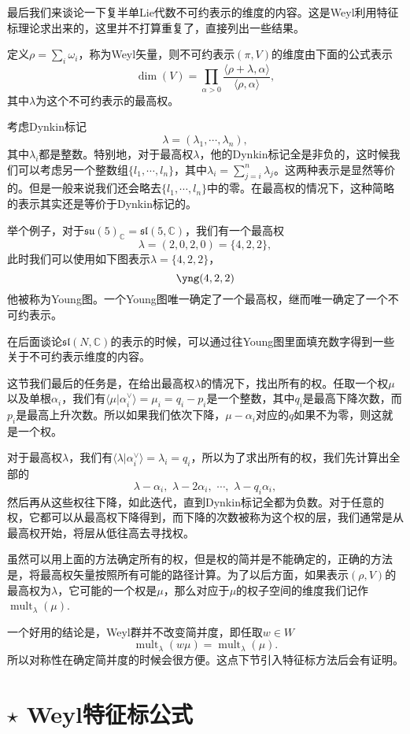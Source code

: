 \documentclass[11pt]{article}
\theoremstyle{definition}
\theoremstyle{plain}
\newcommand{\cc}{\mathbb{C}}
\DeclareMathOperator{\mult}{mult}
\begin{document}
\para 最后我们来谈论一下复半单Lie代数不可约表示的维度的内容。这是Weyl利用特征标理论求出来的，这里并不打算重复了，直接列出一些结果。

定义$\rho=\sum_i \omega_i$，称为Weyl矢量，则不可约表示$(\pi,V)$的维度由下面的公式表示
\[
	\dim(V)=\prod_{\alpha>0}\frac{\langle \rho+\lambda,\alpha\rangle}{\langle \rho,\alpha\rangle},
\]
其中$\lambda$为这个不可约表示的最高权。

\para 考虑Dynkin标记
\[
	\lambda=(\lambda_1,\cdots,\lambda_n),
\]
其中$\lambda_i$都是整数。特别地，对于最高权$\lambda$，他的Dynkin标记全是非负的，这时候我们可以考虑另一个整数组$\{l_1,\cdots,l_n\}$，其中$\lambda_i=\sum_{j=i}^n\lambda_j$。这两种表示是显然等价的。但是一般来说我们还会略去$\{l_1,\cdots,l_n\}$中的零。在最高权的情况下，这种简略的表示其实还是等价于Dynkin标记的。

举个例子，对于$\mathfrak{su}(5)_\cc=\mathfrak{sl}(5,\cc)$，我们有一个最高权
\[
	\lambda=(2,0,2,0)=\{4,2,2\},
\]
此时我们可以使用如下图表示$\lambda=\{4,2,2\}$，
\[
	\yng(4,2,2)
\]
他被称为Young图。一个Young图唯一确定了一个最高权，继而唯一确定了一个不可约表示。

在后面谈论$\mathfrak{sl}(N,\cc)$的表示的时候，可以通过往Young图里面填充数字得到一些关于不可约表示维度的内容。

\para 这节我们最后的任务是，在给出最高权$\lambda$的情况下，找出所有的权。任取一个权$\mu$以及单根$\alpha_i$，我们有$\langle\mu|\alpha^\vee_i\rangle=\mu_i=q_i-p_i$是一个整数，其中$q_i$是最高下降次数，而$p_i$是最高上升次数。所以如果我们依次下降，$\mu-\alpha_i$对应的$q$如果不为零，则这就是一个权。

对于最高权$\lambda$，我们有$\langle\lambda|\alpha^\vee_i\rangle=\lambda_i=q_i$，所以为了求出所有的权，我们先计算出全部的
\[
	\lambda-\alpha_i,\,\,\lambda-2\alpha_i,\,\,\cdots,\,\,\lambda-q_i\alpha_i,
\]
然后再从这些权往下降，如此迭代，直到Dynkin标记全都为负数。对于任意的权，它都可以从最高权下降得到，而下降的次数被称为这个权的层，我们通常是从最高权开始，将层从低往高去寻找权。

\para 虽然可以用上面的方法确定所有的权，但是权的简并是不能确定的，正确的方法是，将最高权矢量按照所有可能的路径计算。为了以后方面，如果表示$(\rho,V)$的最高权为$\lambda$，它可能的一个权是$\mu$，那么对应于$\mu$的权子空间的维度我们记作$\mult_\lambda(\mu)$.

一个好用的结论是，Weyl群并不改变简并度，即任取$w\in W$
\[
	\mult_\lambda(w\mu)=\mult_\lambda(\mu).
\]
所以对称性在确定简并度的时候会很方便。这点下节引入特征标方法后会有证明。

\section{ $\star$ Weyl特征标公式}
\end{document}
